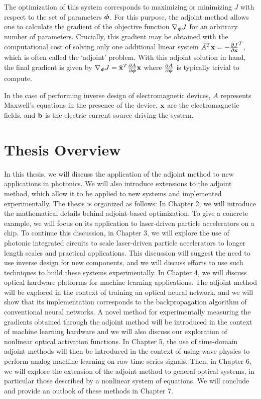 The optimization of this system corresponds to maximizing or minimizing $J$ with respect to the set of parameters $\bm{\phi}$.
For this purpose, the adjoint method allows one to calculate the gradient of the objective function $\nabla_{\bm{\phi}} J$ for an arbitrary number of parameters.
Crucially, this gradient may be obtained with the computational cost of solving only one additional linear system $\hat{A}^T \bar{\mathbf{x}} = -\frac{\partial J}{\partial \mathbf{x}}^T$, which is often called the `adjoint' problem.
With this adjoint solution in hand, the final gradient is given by $\nabla_{\bm{\phi}} J = \bar{\mathbf{x}}^T \frac{\partial A}{\partial \bm{\phi}} \mathbf{x}$ where $\frac{\partial A}{\partial \bm{\phi}}$ is typically trivial to compute.

In the case of performing inverse design of electromagnetic devices, $A$ represents Maxwell's equations in the presence of the device, $\mathbf{x}$ are the electromagnetic fields, and $\mathbf{b}$ is the electric current source driving the system.

\section{Thesis Overview}

In this thesis, we will discuss the application of the adjoint method to new applications in photonics.
We will also introduce extensions to the adjoint method, which allow it to be applied to new systems and implemented experimentally.
The thesis is organized as follows:
In Chapter 2, we will introduce the mathematical details behind adjoint-based optimization.  
To give a concrete example, we will focus on its application to laser-driven particle accelerators on a chip.
To continue this discussion, in Chapter 3, we will explore the use of photonic integrated circuits to scale laser-driven particle accelerators to longer length scales and practical applications.
This discussion will suggest the need to use inverse design for new components, and we will discuss efforts to use such techniques to build these systems experimentally.
In Chapter 4, we will discuss optical hardware platforms for machine learning applications.
The adjoint method will be explored in the context of training an optical neural network, and we will show that its implementation corresponds to the backpropagation algorithm of conventional neural networks.
A novel method for experimentally measuring the gradients obtained through the adjoint method will be introduced in the context of machine learning hardware and we will also discuss our exploration of nonlinear optical activation functions.
In Chapter 5, the use of time-domain adjoint methods will then be introduced in the context of using wave physics to perform analog machine learning on raw time-series signals.
Then, in Chapter 6, we will explore the extension of the adjoint method to general optical systems, in particular those described by a nonlinear system of equations.
We will conclude and provide an outlook of these methods in Chapter 7.
